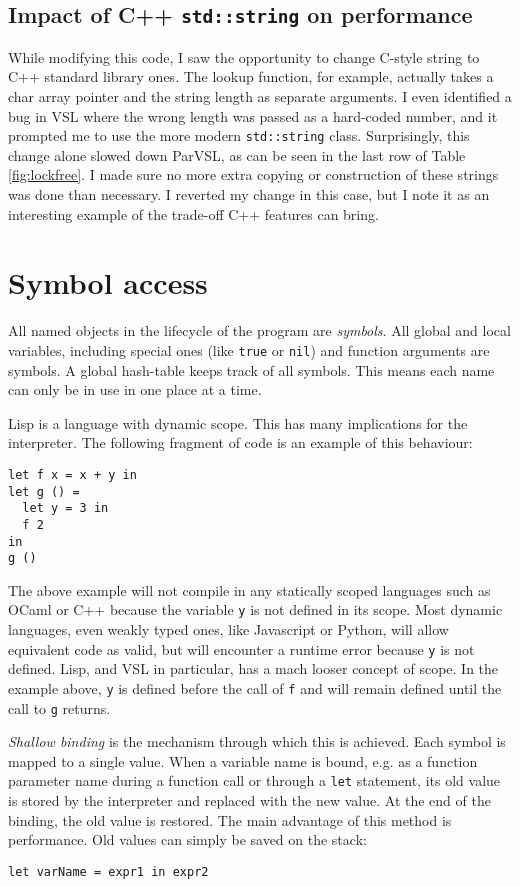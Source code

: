 \subsection{Impact of C++ \texttt{std::string} on performance}

While modifying this code, I saw the opportunity to change C-style string to C++
standard library ones. The lookup function, for example, actually takes a char array
pointer and the string length as separate arguments. I even identified a bug
in VSL where the wrong length was passed as a hard-coded number, and it prompted
me to use the more modern \verb|std::string| class. Surprisingly, this change alone
slowed down ParVSL, as can be seen in the last row of Table \ref{fig:lockfree}.
I made sure no more extra copying or construction of these strings was done than
necessary. I reverted my change in this case, but I note it as an interesting example
of the trade-off C++ features can bring.

\section{Symbol access}
\label{sec:symbols}

All named objects in the lifecycle of the program are \emph{symbols}. All global and local variables, including
special ones (like \texttt{true} or \texttt{nil}) and function arguments are symbols. A global hash-table keeps track of
all symbols. This means each name can only be in use in one place at a time.

Lisp is a language with dynamic scope. This has many implications for the interpreter. The following
fragment of code is an example of this behaviour:
\begin{verbatim}
let f x = x + y in
let g () =
  let y = 3 in
  f 2
in
g ()
\end{verbatim}

The above example will not compile in any statically scoped languages such as OCaml or C++
because the variable \texttt{y} is not defined in its scope.
Most dynamic languages, even weakly typed ones, like Javascript or Python, will allow equivalent
code as valid, but will encounter a runtime error because \texttt{y} is not defined.
Lisp, and VSL in particular, has a mach looser concept of scope.
In the example above, \texttt{y} is defined before the call of \texttt{f} and will remain defined until the
call to \texttt{g} returns.

\emph{Shallow binding} is the mechanism through which this is achieved. Each symbol is mapped to a single value.
When a variable name is bound, e.g. as a function parameter name during a function call or through a
\texttt{let} statement, its old value is stored by the interpreter and replaced with the new value. At the end of the binding,
the old value is restored. The main advantage of this method is performance. Old values can simply be saved
on the stack:
\begin{verbatim}
let varName = expr1 in expr2
\end{verbatim}


